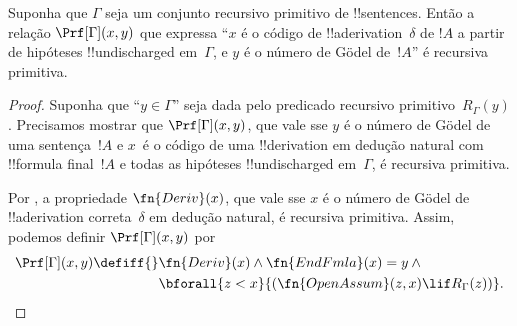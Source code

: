 \documentclass[../../../include/open-logic-section]{subfiles}
\begin{document}
\begin{prop}
  Suponha que $\Gamma$ seja um conjunto recursivo primitivo de
  !!{sentence}s. Então a relação $\Prf[\Gamma](x, y)$ que expressa
  ``$x$ é o código de !!a{derivation}~$\delta$ de $!A$ a partir de
  hipóteses !!{undischarged} em~$\Gamma$, e $y$ é o número de G\"odel
  de~$!A$'' é recursiva primitiva.
\end{prop}

\begin{proof}
  Suponha que ``$y \in \Gamma$'' seja dada pelo predicado recursivo
  primitivo~$R_\Gamma(y)$. Precisamos mostrar que
  $\Prf[\Gamma](x, y)$, que vale sse $y$ é o número de G\"odel de uma
  sentença~$!A$ e $x$~é o código de uma !!{derivation} em dedução
  natural com !!{formula} final~$!A$ e todas as hipóteses
  !!{undischarged} em~$\Gamma$, é recursiva primitiva.

  Por , a propriedade $\fn{Deriv}(x)$, que vale sse
  $x$ é o número de G\"odel de !!a{derivation} correta~$\delta$ em
  dedução natural, é recursiva primitiva. Assim, podemos definir
  $\Prf[\Gamma](x, y)$ por
  \begin{align*}
    \Prf[\Gamma](x, y) \defiff {}
    & \fn{Deriv}(x) \land \fn{EndFmla}(x) = y \land {} \\
    & \bforall{z < x}{(\fn{OpenAssum}(z, x) \lif R_\Gamma(z))}.
  \end{align*}
\end{proof}
\end{document}

